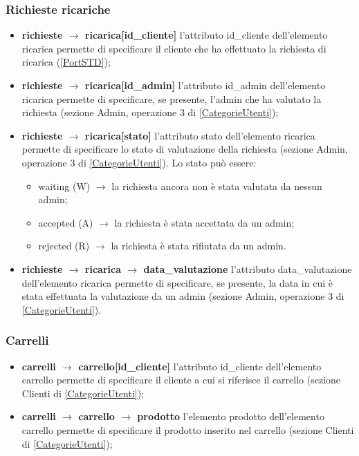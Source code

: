 \documentclass[a4paper, 14pt]{article}
\begin{document}
\begin{flushleft}
			\subsubsection{Richieste ricariche} 
			\begin{itemize}
				\item \textbf{richieste $\rightarrow$ ricarica[id\_cliente] } l'attributo id\_cliente dell'elemento ricarica permette di specificare il cliente che ha effettuato la richiesta di ricarica (\ref{PortSTD});
				\item \textbf{richieste $\rightarrow$ ricarica[id\_admin] } l'attributo id\_admin dell'elemento ricarica permette di specificare, se presente, l'admin che ha valutato la richiesta (sezione Admin, operazione 3 di \ref{CategorieUtenti});
				\item \textbf{richieste $\rightarrow$ ricarica[stato] } l'attributo stato dell'elemento ricarica permette di specificare lo stato di valutazione della richiesta 
				(sezione Admin, operazione 3 di \ref{CategorieUtenti}). Lo stato può essere:
				\begin{itemize}
					\item waiting (W) $\rightarrow$ la richiesta ancora non è stata valutata da nessun admin;
					\item accepted (A) $\rightarrow$ la richiesta è stata accettata da un admin;
					\item rejected (R) $\rightarrow$ la richiesta è stata rifiutata da un admin.
				\end{itemize}
				\item \textbf{richieste $\rightarrow$ ricarica $\rightarrow$ data\_valutazione } l'attributo data\_valutazione dell'elemento ricarica permette di specificare, se presente, la data in cui è stata effettuata la valutazione da un admin (sezione Admin, operazione 3 di \ref{CategorieUtenti}).
			\end{itemize}
			
			\subsubsection{Carrelli} 
			\begin{itemize}
				\item \textbf{carrelli $\rightarrow$ carrello[id\_cliente] } l'attributo id\_cliente dell'elemento carrello permette di specificare il cliente a cui si riferisce il carrello (sezione Clienti di \ref{CategorieUtenti});
				\item \textbf{carrelli $\rightarrow$ carrello $\rightarrow$ prodotto} l'elemento prodotto dell'elemento carrello permette di specificare il prodotto inserito nel carrello (sezione Clienti di \ref{CategorieUtenti});
			\end{itemize}
	\end{flushleft}
\end{document}
